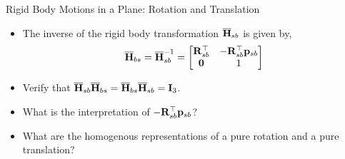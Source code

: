 \documentclass[aspectratio=169]{beamer}
\begin{document}
\begin{frame}{Rigid Body Motions in a Plane: Rotation and Translation}
  \begin{itemize}
    \item The inverse of the rigid body transformation $\overline{\mathbf{H}}_{sb}$ is given by,
    \[ \homo{H}{bs} = \homo{H}{sb}^{-1} = \bmxc \mf{R}_{sb}^\top & -\mf{R}_{sb}^\top\mf{p}_{sb} \\ \mf{0} & 1 \emx \]

    \item Verify that $\overline{\mathbf{H}}_{sb}\overline{\mathbf{H}}_{bs} = \overline{\mathbf{H}}_{bs}\overline{\mathbf{H}}_{sb} = \mathbf{I}_3$.

    \item What is the interpretation of $-\mathbf{R}_{sb}^\top\mathbf{p}_{sb}$?
    
    \item What are the homogenous representations of a pure rotation and a pure translation?
  \end{itemize}
\end{frame}
\end{document}
